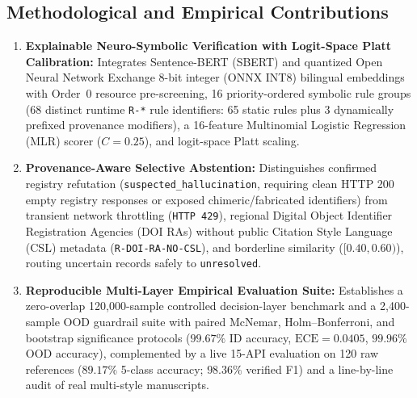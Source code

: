 \subsection{Methodological and Empirical Contributions}
\begin{enumerate}
    \item \textbf{Explainable Neuro-Symbolic Verification with Logit-Space Platt Calibration:} Integrates Sentence-BERT (SBERT) and quantized Open Neural Network Exchange 8-bit integer (ONNX INT8) bilingual embeddings with Order~0 resource pre-screening, 16 priority-ordered symbolic rule groups (68 distinct runtime \texttt{R-*} rule identifiers: 65 static rules plus 3 dynamically prefixed provenance modifiers), a 16-feature Multinomial Logistic Regression (MLR) scorer ($C = 0.25$), and logit-space Platt scaling.
    \item \textbf{Provenance-Aware Selective Abstention:} Distinguishes confirmed registry refutation (\texttt{suspected\_hallucination}, requiring clean HTTP 200 empty registry responses or exposed chimeric/fabricated identifiers) from transient network throttling (\texttt{HTTP 429}), regional Digital Object Identifier Registration Agencies (DOI RAs) without public Citation Style Language (CSL) metadata (\texttt{R-DOI-RA-NO-CSL}), and borderline similarity ($[0.40, 0.60)$), routing uncertain records safely to \texttt{unresolved}.
    \item \textbf{Reproducible Multi-Layer Empirical Evaluation Suite:} Establishes a zero-overlap 120,000-sample controlled decision-layer benchmark and a 2,400-sample OOD guardrail suite with paired McNemar, Holm--Bonferroni, and bootstrap significance protocols ($99.67\%$ ID accuracy, $\text{ECE} = 0.0405$, $99.96\%$ OOD accuracy), complemented by a live 15-API evaluation on 120 raw references ($89.17\%$ 5-class accuracy; $98.36\%$ verified F1) and a line-by-line audit of real multi-style manuscripts.
\end{enumerate}

